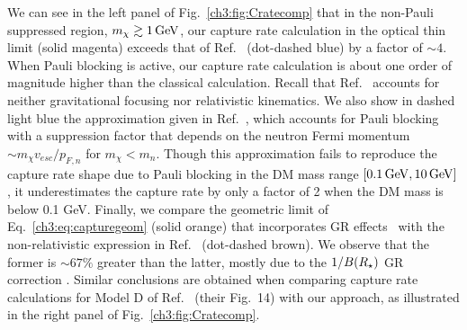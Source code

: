 We can see in the left panel of Fig.~\ref{ch3:fig:Cratecomp} that in the non-Pauli suppressed region, $m_\chi \gtrsim 1{\rm \,GeV}$, our capture rate calculation in the optical thin limit (solid magenta) exceeds that of Ref.~\cite{Garani:2018kkd_may_NewAnalysisNeutron} (dot-dashed blue) by a factor of $\sim 4$. When Pauli blocking is active, our capture rate calculation is about one order of magnitude higher than the classical calculation.  Recall that Ref.~\cite{Garani:2018kkd_may_NewAnalysisNeutron}  accounts for neither gravitational focusing nor relativistic kinematics. 
We also show in dashed light blue the approximation given in Ref.~\cite{McDermott:2010pa_TurningLightsHow}, which accounts for Pauli blocking with a suppression factor that depends on the neutron Fermi momentum $\sim m_\chi v_{esc}/p_{F,n}$ for $m_\chi < m_n$. Though this approximation fails to reproduce the capture rate shape due to Pauli blocking in the DM mass range $[0.1{\rm \,GeV},10{\rm \,GeV}]$, it underestimates the capture rate by only a factor of 2 when the DM mass is below 0.1 GeV. 
Finally, we compare the geometric limit of Eq.~\ref{ch3:eq:capturegeom}  (solid orange) that incorporates GR effects~\cite{Bell:2018pkk_sep_HeatingNeutronStars} with the non-relativistic expression in Ref.~\cite{Garani:2018kkd_may_NewAnalysisNeutron} (dot-dashed brown). We observe that the former is $\sim 67 \%$ greater than the latter, mostly due to the $1/B(R_\star)$ GR correction \cite{Goldman:1989nd_WeaklyInteractingMassive,Kouvaris:2007ay_WIMPAnnihilationCooling}. Similar conclusions are obtained when comparing capture rate calculations for Model D of Ref.~\cite{Garani:2018kkd_may_NewAnalysisNeutron} (their Fig.~14) with our approach, as illustrated in the right panel of Fig.~\ref{ch3:fig:Cratecomp}.

